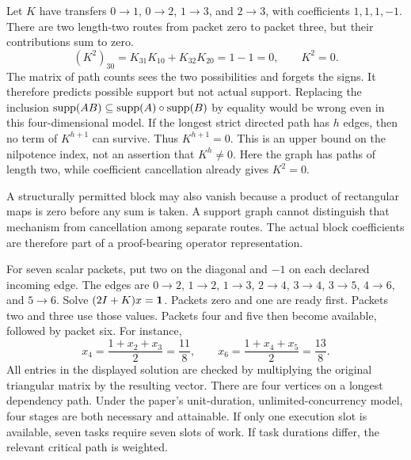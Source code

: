 Let $K$ have transfers $0\to1$, $0\to2$, $1\to3$, and $2\to3$, with coefficients $1,1,1,-1$. There are two length-two routes from packet zero to packet three, but their contributions sum to zero.
\[
(K^2)_{30}=K_{31}K_{10}+K_{32}K_{20}=1-1=0,
\qquad K^2=0.
\]
The matrix of path counts sees the two possibilities and forgets the signs. It therefore predicts possible support but not actual support. Replacing the inclusion $\operatorname{supp}(AB)\subseteq\operatorname{supp}(A)\circ\operatorname{supp}(B)$ by equality would be wrong even in this four-dimensional model.
If the longest strict directed path has $h$ edges, then no term of $K^{h+1}$ can survive. Thus $K^{h+1}=0$. This is an upper bound on the nilpotence index, not an assertion that $K^h\ne0$. Here the graph has paths of length two, while coefficient cancellation already gives $K^2=0$.

A structurally permitted block may also vanish because a product of rectangular maps is zero before any sum is taken. A support graph cannot distinguish that mechanism from cancellation among separate routes. The actual block coefficients are therefore part of a proof-bearing operator representation.

For seven scalar packets, put two on the diagonal and $-1$ on each declared incoming edge. The edges are $0\to2$, $1\to2$, $1\to3$, $2\to4$, $3\to4$, $3\to5$, $4\to6$, and $5\to6$. Solve $(2I+K)x=\mathbf{1}$.
Packets zero and one are ready first. Packets two and three use those values. Packets four and five then become available, followed by packet six. For instance,
\[
x_4=\frac{1+x_2+x_3}{2}=\frac{11}{8},\qquad
x_6=\frac{1+x_4+x_5}{2}=\frac{13}{8}.
\]
All entries in the displayed solution are checked by multiplying the original triangular matrix by the resulting vector.
There are four vertices on a longest dependency path. Under the paper's unit-duration, unlimited-concurrency model, four stages are both necessary and attainable. If only one execution slot is available, seven tasks require seven slots of work. If task durations differ, the relevant critical path is weighted.

